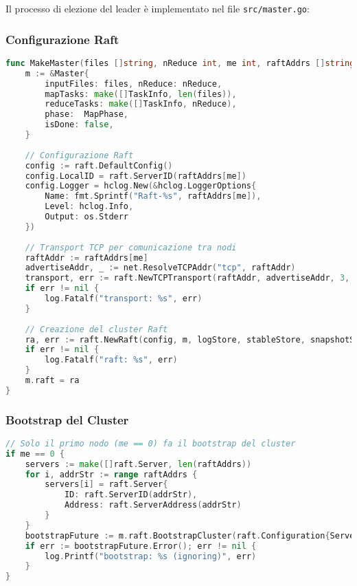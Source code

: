 \documentclass[12pt,a4paper]{article}
\begin{document}
Il processo di elezione del leader è implementato nel file \texttt{src/master.go}:

\subsubsection{Configurazione Raft}

\begin{lstlisting}[language=go]
func MakeMaster(files []string, nReduce int, me int, raftAddrs []string, rpcAddrs []string) *Master {
    m := &Master{
        inputFiles: files, nReduce: nReduce,
        mapTasks: make([]TaskInfo, len(files)), 
        reduceTasks: make([]TaskInfo, nReduce),
        phase:  MapPhase,
        isDone: false,
    }
    
    // Configurazione Raft
    config := raft.DefaultConfig()
    config.LocalID = raft.ServerID(raftAddrs[me])
    config.Logger = hclog.New(&hclog.LoggerOptions{
        Name: fmt.Sprintf("Raft-%s", raftAddrs[me]), 
        Level: hclog.Info, 
        Output: os.Stderr
    })
    
    // Transport TCP per comunicazione tra nodi
    raftAddr := raftAddrs[me]
    advertiseAddr, _ := net.ResolveTCPAddr("tcp", raftAddr)
    transport, err := raft.NewTCPTransport(raftAddr, advertiseAddr, 3, 10*time.Second, os.Stderr)
    if err != nil {
        log.Fatalf("transport: %s", err)
    }
    
    // Creazione del cluster Raft
    ra, err := raft.NewRaft(config, m, logStore, stableStore, snapshotStore, transport)
    if err != nil {
        log.Fatalf("raft: %s", err)
    }
    m.raft = ra
}
\end{lstlisting}

\subsubsection{Bootstrap del Cluster}

\begin{lstlisting}[language=go]
// Solo il primo nodo (me == 0) fa il bootstrap del cluster
if me == 0 {
    servers := make([]raft.Server, len(raftAddrs))
    for i, addrStr := range raftAddrs {
        servers[i] = raft.Server{
            ID: raft.ServerID(addrStr), 
            Address: raft.ServerAddress(addrStr)
        }
    }
    bootstrapFuture := m.raft.BootstrapCluster(raft.Configuration{Servers: servers})
    if err := bootstrapFuture.Error(); err != nil {
        log.Printf("bootstrap: %s (ignoring)", err)
    }
}
\end{lstlisting}
\end{document}

